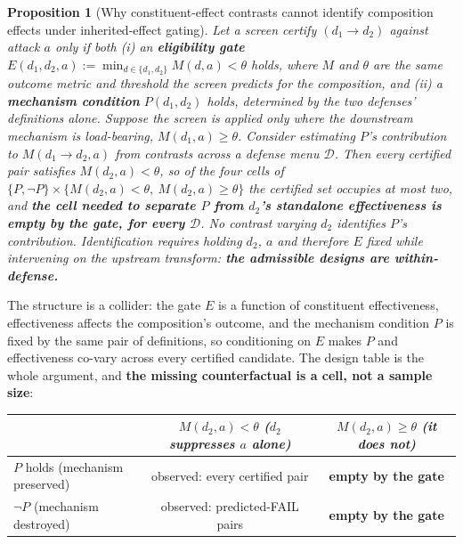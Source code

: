 \documentclass{article}
\newtheorem{proposition}{Proposition}
\begin{document}
\begin{proposition}[Why constituent-effect contrasts cannot identify composition effects under inherited-effect gating]
\label{prop:identification}
Let a screen certify $(d_1 \to d_2)$ against attack $a$ only if both
(i) an \textbf{eligibility gate} $E(d_1,d_2,a) := \min_{d \in \{d_1,d_2\}} M(d,a) < \theta$ holds, where $M$ and $\theta$ are the \emph{same} outcome metric and threshold the screen predicts for the composition, and
(ii) a \textbf{mechanism condition} $P(d_1,d_2)$ holds, determined by the two defenses' definitions alone.
Suppose the screen is applied only where the downstream mechanism is load-bearing, $M(d_1,a) \ge \theta$. Consider estimating $P$'s contribution to $M(d_1 \to d_2, a)$ from contrasts across a defense menu $\mathcal{D}$. Then every certified pair satisfies $M(d_2,a) < \theta$, so of the four cells of $\{P,\neg P\} \times \{M(d_2,a) < \theta,\ M(d_2,a) \ge \theta\}$ the certified set occupies at most two, and \textbf{the cell needed to separate $P$ from $d_2$'s standalone effectiveness is empty by the gate, for every $\mathcal{D}$}. No contrast varying $d_2$ identifies $P$'s contribution. Identification requires holding $d_2$, $a$ and therefore $E$ fixed while intervening on the upstream transform: \textbf{the admissible designs are within-defense.}
\end{proposition}

\noindent The structure is a collider: the gate $E$ is a function of constituent effectiveness, effectiveness affects the composition's outcome, and the mechanism condition $P$ is fixed by the same pair of definitions, so conditioning on $E$ makes $P$ and effectiveness co-vary across every certified candidate. The design table is the whole argument, and \textbf{the missing counterfactual is a cell, not a sample size}:

\begin{center}\small
\begin{tabular}{@{}lcc@{}}
\toprule
& $M(d_2,a) < \theta$ \emph{($d_2$ suppresses $a$ alone)} & $M(d_2,a) \ge \theta$ \emph{(it does not)} \\
\midrule
$P$ holds (mechanism preserved) & observed: every certified pair & \textbf{empty by the gate} \\
$\neg P$ (mechanism destroyed) & observed: predicted-FAIL pairs & \textbf{empty by the gate} \\
\bottomrule
\end{tabular}
\end{center}
\end{document}
